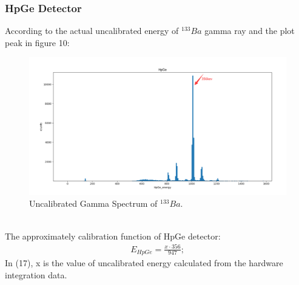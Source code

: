 \documentclass[12pt]{article}
\begin{document}
	\subsubsection{HpGe Detector}
	According to the actual  uncalibrated energy of $^{133}Ba$ gamma ray  and the plot peak in figure 10:
	\begin{figure}[h]
		\centering
		\includegraphics[width=0.7\linewidth, height=0.2\textheight]{pic/uncalibrated_Ba133_HpGe}
		\caption{Uncalibrated Gamma Spectrum of $^{133}Ba$.}
		\label{fig:uncalibratedba133hpge}
	\end{figure}\\
	The approximately  calibration function of HpGe detector:
	\begin{gather}
		E_{HpGe}=\frac{x\cdot 356}{947};
	\end{gather}
	In (17), x is the value of uncalibrated energy calculated from the hardware integration data. 
\end{document}
